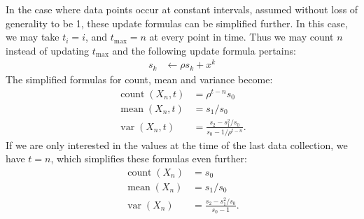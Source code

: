 \documentclass{article}
\DeclareMathOperator{\cnt}{count}
\DeclareMathOperator{\mean}{mean}
\DeclareMathOperator{\var}{var}
\newcommand{\tmax}{{t_\text{max}}}
\begin{document}
In the case where data points occur at constant intervals, assumed without loss of generality to be 1, these update formulas can be simplified further.
In this case, we may take $t_i = i$, and $\tmax = n$ at every point in time.
Thus we may count $n$ instead of updating $\tmax$ and the following update formula pertains:
\begin{align}
s_k &\leftarrow \rho s_k + x^k
\end{align}
The simplified formulas for count, mean and variance become:
\begin{align}
\cnt(X_n,t) &= \rho^{t-n} s_0 \\
\mean(X_n,t) &= s_1/s_0 \\
\var(X_n,t) &= \frac{s_2 - s_1^2/s_0}{s_0-1/\rho^{t-n}}.
\end{align}
If we are only interested in the values at the time of the last data collection, we have $t = n$, which simplifies these formulas even further:
\begin{align}
\cnt(X_n) &= s_0 \\
\mean(X_n) &= s_1/s_0 \\
\var(X_n) &= \frac{s_2 - s_1^2/s_0}{s_0-1}.
\end{align}
\end{document}
